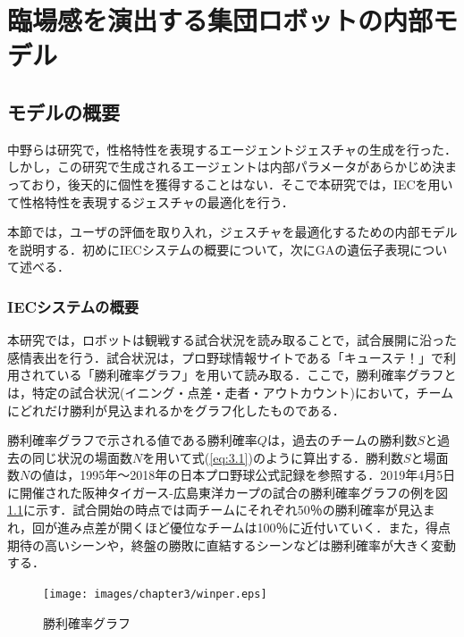 \chapter{臨場感を演出する集団ロボットの内部モデル}
\thispagestyle{fancy} %
\lhead{}
\chead{}
\rhead{}
\lfoot{} 
\cfoot{\thepage}  
\rfoot{}
%

\section{モデルの概要}
\label{sec3.1}


中野らは研究で，性格特性を表現するエージェントジェスチャの生成を行った．しかし，この研究で生成されるエージェントは内部パラメータがあらかじめ決まっており，後天的に個性を獲得することはない．そこで本研究では，IECを用いて性格特性を表現するジェスチャの最適化を行う．

本節では，ユーザの評価を取り入れ，ジェスチャを最適化するための内部モデルを説明する．初めにIECシステムの概要について，次にGAの遺伝子表現について述べる．



\subsection{IECシステムの概要}
\label{sec3.1.1}    

本研究では，ロボットは観戦する試合状況を読み取ることで，試合展開に沿った感情表出を行う．試合状況は，プロ野球情報サイトである「キューステ！」で利用されている「勝利確率グラフ」を用いて読み取る\cite{kyusute}．ここで，勝利確率グラフとは，特定の試合状況(イニング・点差・走者・アウトカウント)において，チームにどれだけ勝利が見込まれるかをグラフ化したものである．

勝利確率グラフで示される値である勝利確率$Q$は，過去のチームの勝利数$S$と過去の同じ状況の場面数$N$を用いて式(\ref{eq:3.1})のように算出する．勝利数$S$と場面数$N$の値は，1995年～2018年の日本プロ野球公式記録を参照する．2019年4月5日に開催された阪神タイガース-広島東洋カープの試合の勝利確率グラフの例を図\ref{win_percent}に示す．試合開始の時点では両チームにそれぞれ50％の勝利確率が見込まれ，回が進み点差が開くほど優位なチームは100％に近付いていく．また，得点期待の高いシーンや，終盤の勝敗に直結するシーンなどは勝利確率が大きく変動する．

\vspace{1cm}
 \begin{figure}[H]
 \begin{center}
  \centering
  \texttt{[image: images/chapter3/winper.eps]}
  \caption{勝利確率グラフ}
  \label{win_percent}
 \end{center}
\end{figure}


